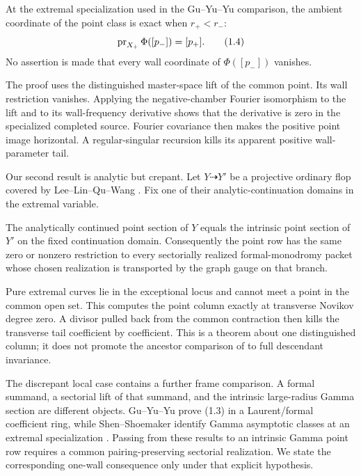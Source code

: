 \begin{theorem}
\label{thm:intro-simple-wall}
At the extremal specialization used in the Gu--Yu--Yu comparison, the
ambient coordinate of the point class is exact when \(r_+<r_-\):
\[
 \operatorname{pr}_{X_+}\Phi([p_-])=[p_+].                              \tag{1.4}
\]
No assertion is made that every wall coordinate of \(\Phi([p_-])\) vanishes.
\end{theorem}

The proof uses the distinguished master-space lift of the common point.  Its
wall restriction vanishes.  Applying the negative-chamber Fourier
isomorphism to the lift and to its wall-frequency derivative shows that the
derivative is zero in the specialized completed source.  Fourier covariance
then makes the positive point image horizontal.  A regular-singular
recursion kills its apparent positive wall-parameter tail.

Our second result is analytic but crepant.  Let \(Y\dashrightarrow Y'\) be a
projective ordinary flop covered by Lee--Lin--Qu--Wang
\cite{LeeLinQuWang}.  Fix one of their analytic-continuation domains in the
extremal variable.

\begin{theorem}
\label{thm:intro-flop}
The analytically continued point section of \(Y\) equals the intrinsic point
section of \(Y'\) on the fixed continuation domain.  Consequently the point
row has the same zero or nonzero restriction to every sectorially realized
formal-monodromy packet whose chosen realization is transported by the graph
gauge on that branch.
\end{theorem}

Pure extremal curves lie in the exceptional locus and cannot meet a point in
the common open set.  This computes the point column exactly at transverse
Novikov degree zero.  A divisor pulled back from the common contraction then
kills the transverse tail coefficient by coefficient.  This is a theorem
about one distinguished column; it does not promote the ancestor comparison
of \cite{LeeLinQuWang} to full descendant invariance.

The discrepant local case contains a further frame comparison.  A formal summand,
a sectorial lift of that summand, and the intrinsic large-radius Gamma
section are different objects.  Gu--Yu--Yu prove (1.3) in a Laurent/formal
coefficient ring, while Shen--Shoemaker identify Gamma asymptotic classes at
an extremal specialization \cite{ShenShoemaker}.  Passing from these results
to an intrinsic Gamma point row requires a common pairing-preserving
sectorial realization.  We state the corresponding one-wall consequence
only under that explicit hypothesis.

